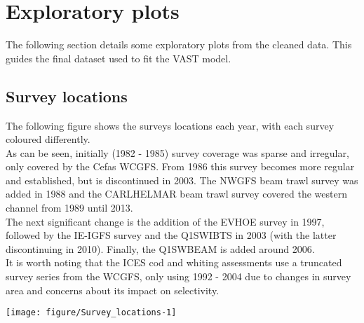 \documentclass[12pt]{article}\usepackage[]{graphicx}\usepackage[]{color}
\makeatletter
\newenvironment{kframe}{%
 \def\at@end@of@kframe{}%
 \ifinner\ifhmode%
  \def\at@end@of@kframe{\end{minipage}}%
  \begin{minipage}{\columnwidth}%
 \fi\fi%
 \def\FrameCommand##1{\hskip\@totalleftmargin \hskip-\fboxsep
 \colorbox{shadecolor}{##1}\hskip-\fboxsep
     \hskip-\linewidth \hskip-\@totalleftmargin \hskip\columnwidth}%
 \MakeFramed {\advance\hsize-\width
   \@totalleftmargin\z@ \linewidth\hsize
   \@setminipage}}%
 {\par\unskip\endMakeFramed%
 \at@end@of@kframe}
\newenvironment{knitrout}{}{} %
\makeatother
\begin{document}
\begin{knitrout}\footnotesize
{}\color{fgcolor}\begin{kframe}


{\ttfamily\noindent\bfseries\color{errorcolor}{\#\# Error in eval(expr, envir, enclos): object 'f' not found}}\end{kframe}
\end{knitrout}



\section{Exploratory plots}

The following section details some exploratory plots from the cleaned data.
This guides the final dataset used to fit the VAST model.




\subsection{Survey locations}

The following figure shows the surveys locations each year, with each survey
coloured differently.\\

As can be seen, initially (1982 - 1985) survey coverage was sparse and
irregular, only covered by the Cefas WCGFS. From 1986 this survey becomes more
regular and established, but is discontinued in 2003. The NWGFS beam trawl
survey was added in 1988 and the CARLHELMAR beam trawl survey covered the
western channel from 1989 until 2013.\\

The next significant change is the addition of the EVHOE survey in 1997,
followed by the IE-IGFS survey and the Q1SWIBTS in 2003 (with the latter
discontinuing in 2010). Finally, the Q1SWBEAM is added around 2006. \\

It is worth noting that the ICES cod and whiting assessments use a truncated
survey series from the WCGFS, only using 1992 - 2004 due to changes in survey
area and concerns about its impact on selectivity. \\

\begin{landscape}

\begin{knitrout}\footnotesize
{}\color{fgcolor}
\texttt{[image: figure/Survey\_locations-1]} 

\end{knitrout}

\end{landscape}
\end{document}
